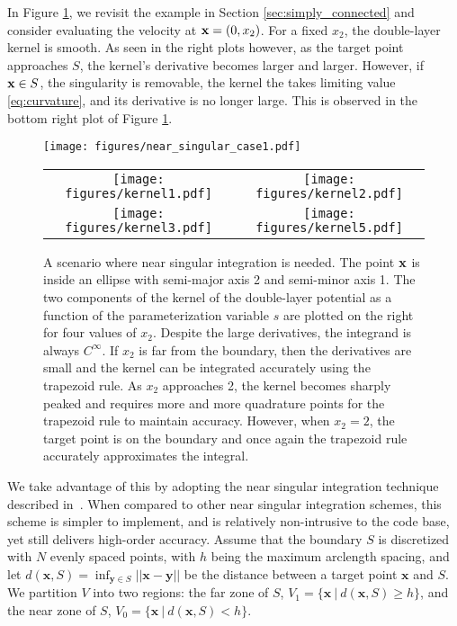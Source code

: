 In Figure \ref{fig:near_experiment}, we revisit the example in Section \ref{sec:simply_connected} and consider evaluating the velocity at ${\mathbf{x}}=(0,x_2)$. For a fixed $x_2$, the double-layer kernel is smooth. As seen in the right plots however, as the target point approaches $S$, the kernel's derivative becomes larger and larger. However, if ${\mathbf{x}}\in S$, the singularity is removable, the kernel the takes limiting value \eqref{eq:curvature}, and its derivative is no longer large. This is observed in the bottom right plot of Figure \ref{fig:near_experiment}.

\begin{figure}[!h]
\begin{minipage}{0.25\textwidth}
\texttt{[image: figures/near\_singular\_case1.pdf]}
\end{minipage}
\begin{minipage}{0.75\textwidth}
\begin{center}
\begin{tabular}{c c}
	\texttt{[image: figures/kernel1.pdf]} & \texttt{[image: figures/kernel2.pdf]}\\ 
	\texttt{[image: figures/kernel3.pdf]} & \texttt{[image: figures/kernel5.pdf]}
\end{tabular}
\end{center}
\end{minipage}
\caption[Problem that requires near singular integration.]{A scenario where near singular integration is needed. The point ${\mathbf{x}}$ is inside an ellipse with semi-major axis 2 and semi-minor axis 1. The two components of the kernel of the double-layer potential as a function of the parameterization variable $s$ are plotted on the right for four values of $x_2$. Despite the large derivatives, the integrand is always $C^\infty$. If $x_2$ is far from the boundary, then the derivatives are small and the kernel can be integrated accurately using the trapezoid rule. As $x_2$ approaches 2, the kernel becomes sharply peaked and requires more and more quadrature points for the trapezoid rule to maintain accuracy. However, when $x_2=2$, the target point is on the boundary and once again the trapezoid rule accurately approximates the integral. }\label{fig:near_experiment}
\end{figure}

We take advantage of this by adopting the near singular integration technique described in~\cite{Quaife2014, Ying2006}. When compared to other near singular integration schemes, this scheme is simpler to implement, and is relatively non-intrusive to the code base, yet still delivers high-order accuracy.  Assume that the boundary $S$ is discretized with $N$ evenly spaced points, with $h$ being the maximum arclength spacing, and let $d(\mathbf{x},S) = \inf_{\mathbf{y}\in S}||\mathbf{x}-\mathbf{y}||$ be the distance between a target point $\mathbf{x}$ and $S$. We partition $V$ into two regions: the far zone of $S$, $V_1 = \{\mathbf{x}\: |\: d(\mathbf{x},S) \geq h\}$, and the near zone of $S$, $V_0 = \{\mathbf{x}\:  |\: d(\mathbf{x},S) < h\}$. 


